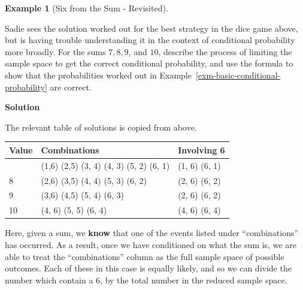 \documentclass[
  letterpaper,
  DIV=11,
  numbers=noendperiod]{scrreprt}
\theoremstyle{definition}
\theoremstyle{definition}
\theoremstyle{definition}
\newtheorem{example}{Example}[chapter]
\theoremstyle{remark}
\begin{document}
\begin{example}[Six from the Sum -
Revisited]\protect\hypertarget{exm-basic-conditional-probability-rev}{}\label{exm-basic-conditional-probability-rev}

Sadie sees the solution worked out for the best strategy in the dice
game above, but is having trouble understanding it in the context of
conditional probability more broadly. For the sums \(7, 8, 9\), and
\(10\), describe the process of limiting the sample space to get the
correct conditional probability, and use the formula to show that the
probabilities worked out in
Example~\ref{exm-basic-conditional-probability} are correct.

\begin{tcolorbox}[enhanced jigsaw, colback=white, breakable, rightrule=.15mm, leftrule=.75mm, toprule=.15mm, left=2mm, arc=.35mm, opacityback=0, bottomrule=.15mm]

\vspace{-3mm}\textbf{Solution}\vspace{3mm}

The relevant table of solutions is copied from above.

\begin{longtable}[]{@{}lll@{}}
\toprule\noalign{}
Value & Combinations & Involving 6 \\
\midrule\noalign{}
\endhead
\bottomrule\noalign{}
\endlastfoot
7 & (1,6) (2,5) (3, 4) (4, 3) (5, 2) (6, 1) & (1, 6) (6, 1) \\
8 & (2,6) (3,5) (4, 4) (5, 3) (6, 2) & (2, 6) (6, 2) \\
9 & (3,6) (4,5) (5, 4) (6, 3) & (2, 6) (6, 2) \\
10 & (4, 6) (5, 5) (6, 4) & (4, 6) (6, 4) \\
\end{longtable}

Here, given a sum, we \textbf{know} that one of the events listed under
``combinations'' has occurred. As a result, once we have conditioned on
what the sum is, we are able to treat the ``combinations'' column as the
full sample space of possible outcomes. Each of these in this case is
equally likely, and so we can divide the number which contain a \(6\),
by the total number in the reduced sample space.


\end{tcolorbox}
\end{example}
\end{document}
